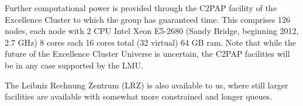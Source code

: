 \documentclass[10pt,fleqn,twoside]{article}
\begin{document}
Further computational power is provided through the C2PAP facility of the Excellence Cluster to which
the group has guaranteed time. This comprises 126 nodes, each node with 2 CPU Intel Xeon E5-2680 (Sandy
Bridge, beginning 2012, 2.7 GHz) 8 cores each 16 cores total (32
virtual) 64 GB ram. Note that while the future of the Excellence
Cluster Universe is uncertain, the C2PAP facilities will be in any
case supported by the LMU. 

The Leibniz Rechnung Zentrum (LRZ) is also available to us, where still
larger facilities are available with somewhat more constrained and longer queues.

% 
% 
% 
\end{document}
